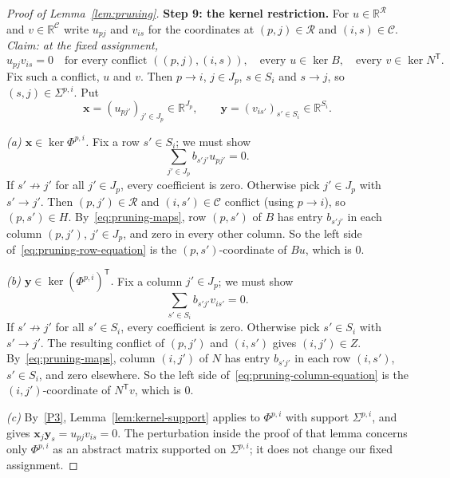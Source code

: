 \documentclass[11pt]{article}
\theoremstyle{remark}
\newcommand{\R}{\mathbb R}
\newcommand{\step}[1]{\par\medskip\noindent\textbf{#1}\enspace}
\begin{document}
\begin{proof}[Proof of Lemma~\ref{lem:pruning}]
\step{Step 9: the kernel restriction.}
For $u\in\R^{\mathcal R}$ and $v\in\R^{\mathcal C}$ write $u_{pj}$ and
$v_{is}$ for the coordinates at $(p,j)\in\mathcal R$ and
$(i,s)\in\mathcal C$.  \emph{Claim: at the fixed assignment,}
\begin{equation}\label{eq:conflict-kernel}
 u_{pj}v_{is}=0
 \quad\text{for every conflict }((p,j),(i,s)),
 \quad\text{every }u\in\ker B,\quad\text{every }v\in\ker N^{\mathsf T}.
\end{equation}
Fix such a conflict, $u$ and $v$.  Then $p\to i$, $j\in J_p$, $s\in S_i$
and $s\to j$, so $(s,j)\in\Sigma^{p,i}$.  Put
\[
 \mathbf x=(u_{pj'})_{j'\in J_p}\in\R^{J_p},\qquad
 \mathbf y=(v_{is'})_{s'\in S_i}\in\R^{S_i}.
\]

\emph{(a) $\mathbf x\in\ker\Phi^{p,i}$.}  Fix a row $s'\in S_i$; we must show
\begin{equation}\label{eq:pruning-row-equation}
 \sum_{j'\in J_p}b_{s'j'}u_{pj'}=0.
\end{equation}
If $s'\not\to j'$ for all $j'\in J_p$, every coefficient is zero.
Otherwise pick $j'\in J_p$ with $s'\to j'$.  Then $(p,j')\in\mathcal R$ and
$(i,s')\in\mathcal C$ conflict (using $p\to i$), so $(p,s')\in H$.
By~\eqref{eq:pruning-maps}, row $(p,s')$ of $B$ has entry $b_{s'j'}$ in each
column $(p,j')$, $j'\in J_p$, and zero in every other column.  So the left
side of~\eqref{eq:pruning-row-equation} is the $(p,s')$-coordinate of $Bu$,
which is $0$.

\emph{(b) $\mathbf y\in\ker(\Phi^{p,i})^{\mathsf T}$.}  Fix a column
$j'\in J_p$; we must show
\begin{equation}\label{eq:pruning-column-equation}
 \sum_{s'\in S_i}b_{s'j'}v_{is'}=0.
\end{equation}
If $s'\not\to j'$ for all $s'\in S_i$, every coefficient is zero.
Otherwise pick $s'\in S_i$ with $s'\to j'$.  The resulting conflict of
$(p,j')$ and $(i,s')$ gives $(i,j')\in Z$.  By~\eqref{eq:pruning-maps},
column $(i,j')$ of $N$ has entry $b_{s'j'}$ in each row $(i,s')$,
$s'\in S_i$, and zero elsewhere.  So the left side
of~\eqref{eq:pruning-column-equation} is the $(i,j')$-coordinate of
$N^{\mathsf T}v$, which is $0$.

\emph{(c)} By~\ref{P3}, Lemma~\ref{lem:kernel-support} applies to
$\Phi^{p,i}$ with support $\Sigma^{p,i}$, and gives
$\mathbf x_j\mathbf y_s=u_{pj}v_{is}=0$.
The perturbation inside the proof of that lemma concerns only
$\Phi^{p,i}$ as an abstract matrix supported on $\Sigma^{p,i}$; it does not
change our fixed assignment.


\end{proof}
\end{document}
